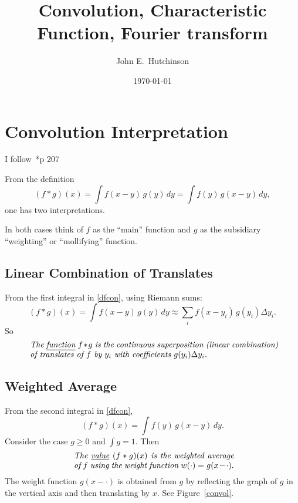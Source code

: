 \documentclass[a4paper]{amsart}
\theoremstyle{plain}
\theoremstyle{definition}
\theoremstyle{remark}
\begin{document}
\title{Convolution, Characteristic Function, Fourier transform}  
\author{John E.\ Hutchinson}
\date{\today}

\maketitle




\tableofcontents

\section{\textbf{Convolution Interpretation}} 
I follow~\cite{Fol}*{p 207} 

\medskip From the definition
\begin{equation} \label{dfcon} 
(f*g)(x) = \int  f(x-y) \, g(y)\, dy = \int f(y)\, g(x-y) \, dy,
\end{equation} 
one has two interpretations.

In both cases think of $ f $ as the ``main'' function and $ g $ as the subsidiary ``weighting'' or ``mollifying'' function.

\subsection{Linear Combination of Translates}
From the first integral in \eqref{dfcon}, using Riemann sums:
\[
(f*g)(x)  = \int  f(x-y) \, g(y)\, dy \approx \sum_i f(x-y_i)\, g(y_i) \Delta y_i .
\]
So 
\begin{gather} \label{} 
\text{ \parbox{4.2in}{ \emph{The \underline{function}  $ f *g$ is the continuous superposition (linear combination) of translates of $ f $ by $ y_i $ with coefficients $ g(y_i)\Delta y_i $.}}} 
\end{gather} 


\subsection{Weighted Average}
From the second  integral in \eqref{dfcon},
\[
(f*g)(x)   = \int f(y)\, g(x-y) \, dy.
\]
Consider the case $ g \geq 0 $ and $ \int g= 1 $.  
Then 
\begin{gather} \label{} 
\text{ \parbox{2.7in}{
\emph{The \underline{value}   $(f*g)(x) $  is the weighted average of $ f $ using the weight function  $ w(\cdot) = g(x-\cdot) $}.}}
\end{gather}
The weight function $g(x-\cdot) $  is obtained from $ g $ by reflecting the graph of $ g $ in the vertical axis and then translating by $x $.  See Figure~\ref{convol}.
\end{document}
